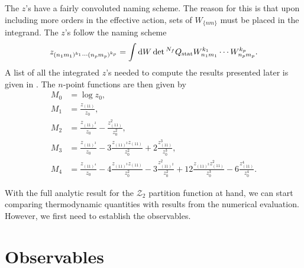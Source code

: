 %
The $z$'s have a fairly convoluted naming scheme. The reason for this is that
upon including more orders in the effective action, sets of $W_{\{nm\}}$
must be placed in the integrand. The $z$'s follow the naming scheme
%
\begin{equation} \label{eq:lce_z_definition}
  z_{(n_1 m_1)^{k_1}\cdots(n_p m_p)^{k_p}} = \int \mathrm{d} W \det{}^{N_f} Q_{\text{stat}}
  W_{n_1 m_1}^{k_1} \cdots W_{n_p m_p}^{k_p}.
\end{equation}
%
A list of all the integrated $z$'s needed to compute the results presented
later is given in . The $n$-point functions are then
given by
%
\begin{subequations}
\begin{align}
  M_0 &= \log z_0, \\
  M_1 &= \frac{z_{(11)}}{z_0}, \\
  M_2 &= \frac{z_{(11)^2}}{z_0} - \frac{z_{(11)}^2}{z_0^2}, \\
  M_3 &= \frac{z_{(11)^3}}{z_0} - 3 \frac{z_{(11)^2} z_{(11)}}{z_0^2} + 2 \frac{z_{(11)}^3}{z_0^3}, \\
  M_4 &= \frac{z_{(11)^4}}{z_0} - 4 \frac{z_{(11)^3} z_{(11)}}{z_0^2} - 3
  \frac{z_{(11)^2}^2}{z_0^2} + 12 \frac{z_{(11)^2} z_{(11)}^2}{z_0^3} - 6 \frac{z_{(11)}^4}{z_0^4}.
\end{align} 
\end{subequations}

With the full analytic result for the $\mathcal{Z}_2$ partition function at
hand, we can start comparing thermodynamic quantities with results from the
numerical evaluation. However, we first need to establish the observables.


\section{Observables}

